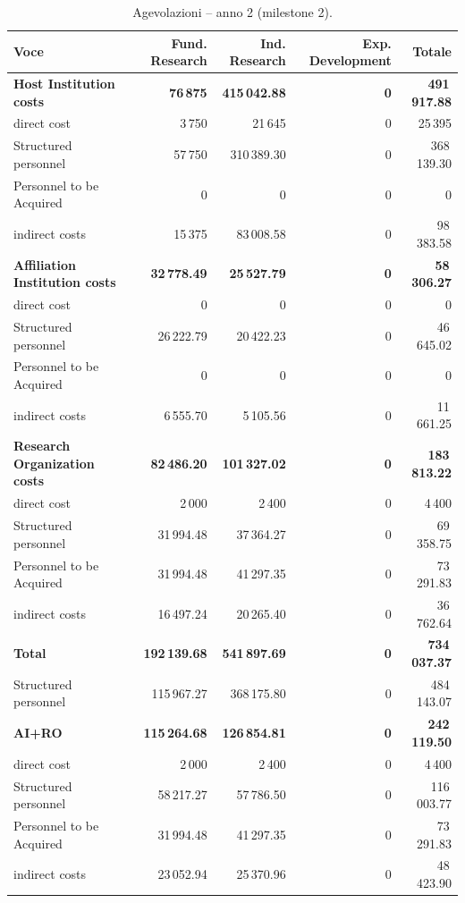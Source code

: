 \documentclass{plan4ari_report}
\begin{document}
\begin{table}[H]\centering\small
\caption{Agevolazioni -- anno 2 (milestone 2).}\label{tab:bpy-a-y2}
\begin{tabular}{lrrrr}\toprule
\textbf{Voce} & \textbf{Fund. Research} & \textbf{Ind. Research} & \textbf{Exp. Development} & \textbf{Totale} \\\midrule
\textbf{Host Institution costs} & \textbf{76\,875} & \textbf{415\,042.88} & \textbf{0} & \textbf{491\,917.88} \\
\quad direct cost & 3\,750 & 21\,645 & 0 & 25\,395 \\
\quad Structured personnel & 57\,750 & 310\,389.30 & 0 & 368\,139.30 \\
\quad Personnel to be Acquired & 0 & 0 & 0 & 0 \\
\quad indirect costs & 15\,375 & 83\,008.58 & 0 & 98\,383.58 \\
\textbf{Affiliation Institution costs} & \textbf{32\,778.49} & \textbf{25\,527.79} & \textbf{0} & \textbf{58\,306.27} \\
\quad direct cost & 0 & 0 & 0 & 0 \\
\quad Structured personnel & 26\,222.79 & 20\,422.23 & 0 & 46\,645.02 \\
\quad Personnel to be Acquired & 0 & 0 & 0 & 0 \\
\quad indirect costs & 6\,555.70 & 5\,105.56 & 0 & 11\,661.25 \\
\textbf{Research Organization costs} & \textbf{82\,486.20} & \textbf{101\,327.02} & \textbf{0} & \textbf{183\,813.22} \\
\quad direct cost & 2\,000 & 2\,400 & 0 & 4\,400 \\
\quad Structured personnel & 31\,994.48 & 37\,364.27 & 0 & 69\,358.75 \\
\quad Personnel to be Acquired & 31\,994.48 & 41\,297.35 & 0 & 73\,291.83 \\
\quad indirect costs & 16\,497.24 & 20\,265.40 & 0 & 36\,762.64 \\
\midrule
\textbf{Total} & \textbf{192\,139.68} & \textbf{541\,897.69} & \textbf{0} & \textbf{734\,037.37} \\
\quad Structured personnel & 115\,967.27 & 368\,175.80 & 0 & 484\,143.07 \\
\textbf{AI+RO} & \textbf{115\,264.68} & \textbf{126\,854.81} & \textbf{0} & \textbf{242\,119.50} \\
\quad direct cost & 2\,000 & 2\,400 & 0 & 4\,400 \\
\quad Structured personnel & 58\,217.27 & 57\,786.50 & 0 & 116\,003.77 \\
\quad Personnel to be Acquired & 31\,994.48 & 41\,297.35 & 0 & 73\,291.83 \\
\quad indirect costs & 23\,052.94 & 25\,370.96 & 0 & 48\,423.90 \\
\bottomrule\end{tabular}
\end{table}
\end{document}
